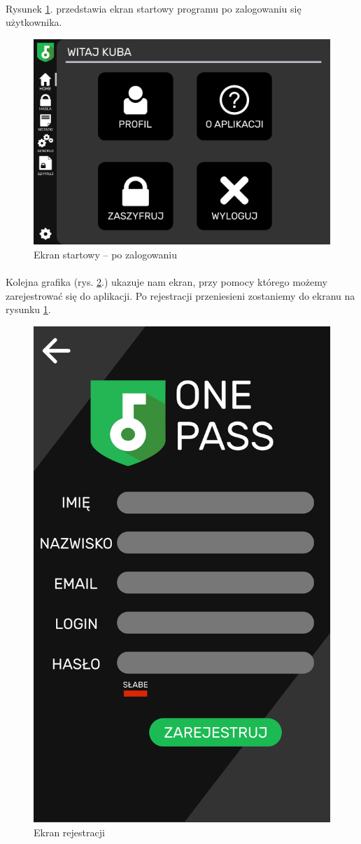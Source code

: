 \documentclass[a4paper]{article}
\begin{document}
\paragraph{}Rysunek \ref{fig:startPo}. przedstawia ekran startowy programu po zalogowaniu się użytkownika.
\begin{figure}[H]
    \centering
    \includegraphics[width=1\textwidth]{img/ekran_po_zalogowaniu.png}
    \caption{Ekran startowy -- po zalogowaniu}
    \label{fig:startPo}
\end{figure}

\newpage

\paragraph{}Kolejna grafika (rys. \ref{fig:rejestracja}.) ukazuje nam ekran, przy pomocy którego możemy zarejestrować się do aplikacji. Po rejestracji przeniesieni zostaniemy do ekranu na rysunku \ref{fig:startPo}.
\begin{figure}[H]
    \centering
    \includegraphics[height=1\textwidth]{img/ekran_rejestracji.png}
    \caption{Ekran rejestracji}
    \label{fig:rejestracja}
\end{figure}
\end{document}
